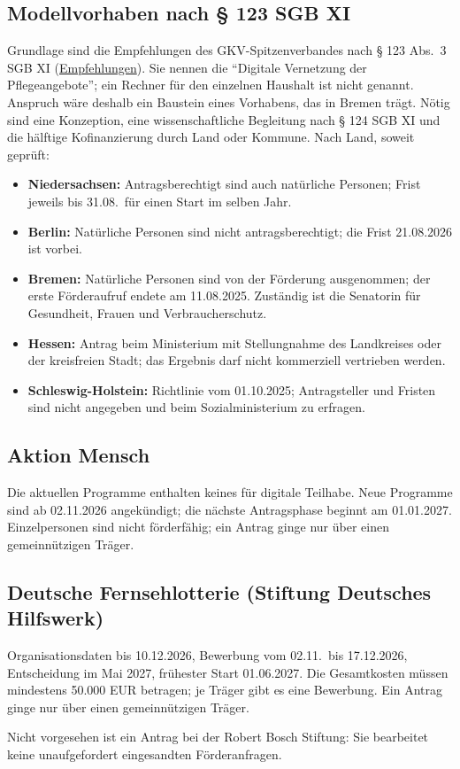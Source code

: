 \documentclass[11pt,a4paper,parskip=half-]{scrartcl}
\begin{document}
\subsection{Modellvorhaben nach § 123 SGB XI}
Grundlage sind die Empfehlungen des GKV-Spitzenverbandes nach § 123 Abs.~3 SGB XI
(\href{https://www.gkv-spitzenverband.de/media/dokumente/pflegeversicherung/richtlinien__vereinbarungen__formulare/2026-06-01_Pflege_Empfehlungen_nach_123_Abs.3_SGB_XI.pdf}{Empfehlungen}).
Sie nennen die \enquote{Digitale Vernetzung der Pflegeangebote}; ein Rechner für den einzelnen Haushalt
ist nicht genannt. Anspruch wäre deshalb ein Baustein eines Vorhabens, das 
in Bremen trägt. Nötig sind eine Konzeption, eine wissenschaftliche Begleitung nach § 124 SGB XI
und die hälftige Kofinanzierung durch Land oder Kommune.
Nach Land, soweit geprüft:
\begin{itemize}
  \item \textbf{Niedersachsen:} Antragsberechtigt sind auch natürliche Personen; Frist jeweils
        bis 31.08.\ für einen Start im selben Jahr.
  \item \textbf{Berlin:} Natürliche Personen sind nicht antragsberechtigt; die Frist 21.08.2026 ist
        vorbei.
  \item \textbf{Bremen:} Natürliche Personen sind von der Förderung ausgenommen; der erste
        Förderaufruf endete am 11.08.2025. Zuständig ist die Senatorin für Gesundheit, Frauen und
        Verbraucherschutz.
  \item \textbf{Hessen:} Antrag beim Ministerium mit Stellungnahme des Landkreises oder der
        kreisfreien Stadt; das Ergebnis darf nicht kommerziell vertrieben werden.
  \item \textbf{Schleswig-Holstein:} Richtlinie vom 01.10.2025; Antragsteller und Fristen sind nicht
        angegeben und beim Sozialministerium zu erfragen.
\end{itemize}

\subsection{Aktion Mensch}
Die aktuellen Programme enthalten keines für digitale Teilhabe. Neue Programme sind ab 02.11.2026
angekündigt; die nächste Antragsphase beginnt am 01.01.2027. Einzelpersonen sind nicht förderfähig;
ein Antrag ginge nur über einen gemeinnützigen Träger.

\subsection{Deutsche Fernsehlotterie (Stiftung Deutsches Hilfswerk)}
Organisationsdaten bis 10.12.2026, Bewerbung vom 02.11.\ bis 17.12.2026, Entscheidung im Mai 2027,
frühester Start 01.06.2027. Die Gesamtkosten müssen mindestens 50.000 EUR betragen; je Träger
gibt es eine Bewerbung. Ein Antrag ginge nur über einen gemeinnützigen Träger.%

Nicht vorgesehen ist ein Antrag bei der Robert Bosch Stiftung: Sie bearbeitet keine unaufgefordert
eingesandten Förderanfragen.
\end{document}
